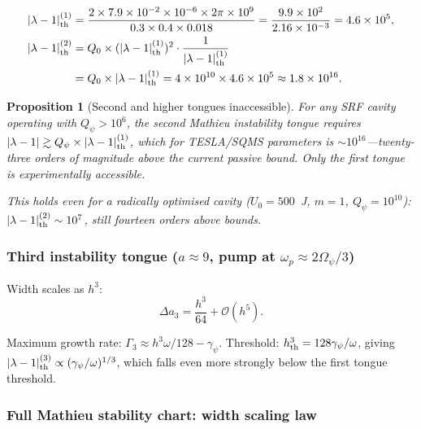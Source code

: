 \documentclass[11pt,twocolumn]{article}
\newcommand{\lam}{\lambda}
\newcommand{\Opsi}{\Omega_\psi}
\newcommand{\gpsi}{\gamma_\psi}
\newcommand{\order}[1]{\mathcal{O}(#1)}
\newtheorem{proposition}{Proposition}
\begin{document}
\begin{align}
|\lam-1|_{\rm th}^{(1)} &= \frac{2\times7.9\times10^{-2}\times10^{-6}
\times2\pi\times10^9}{0.3\times0.4\times0.018}
= \frac{9.9\times10^{2}}{2.16\times10^{-3}} = 4.6\times10^{5},
\\
|\lam-1|_{\rm th}^{(2)} &= Q_0 \times (|\lam-1|_{\rm th}^{(1)})^2
\cdot\frac{1}{|\lam-1|_{\rm th}^{(1)}}
\nonumber\\
&= Q_0 \times |\lam-1|_{\rm th}^{(1)}
= 4\times10^{10}\times4.6\times10^{5} \approx 1.8\times10^{16}.
\end{align}

\begin{proposition}[Second and higher tongues inaccessible]
\label{prop:higher_tongues}
For any SRF cavity operating with $Q_\psi > 10^6$, the second
Mathieu instability tongue requires $|\lam-1| \gtrsim Q_\psi \times
|\lam-1|_{\rm th}^{(1)}$, which for TESLA/SQMS parameters is
$\sim 10^{16}$---twenty-three orders of magnitude above the current
passive bound. Only the first tongue is experimentally accessible.

This holds even for a radically optimised cavity ($U_0 = 500$~J,
$m = 1$, $Q_\psi = 10^{10}$): $|\lam-1|_{\rm th}^{(2)} \sim 10^{7}$,
still fourteen orders above bounds.
\end{proposition}

\subsubsection{Third instability tongue ($a \approx 9$,
pump at $\omega_p \approx 2\Opsi/3$)}
\label{sec:tongue3}

Width scales as $h^3$:
\begin{equation}
\Delta a_3 = \frac{h^3}{64} + \order{h^5}.
\label{eq:tongue3_width}
\end{equation}

Maximum growth rate: $\Gamma_3 \approx h^3\omega/128 - \gpsi$.
Threshold: $h^3_{\rm th} = 128\gpsi/\omega$, giving
$|\lam-1|_{\rm th}^{(3)} \propto (\gpsi/\omega)^{1/3}$, which
falls even more strongly below the first tongue threshold.

\subsubsection{Full Mathieu stability chart: width scaling law}
\end{document}

